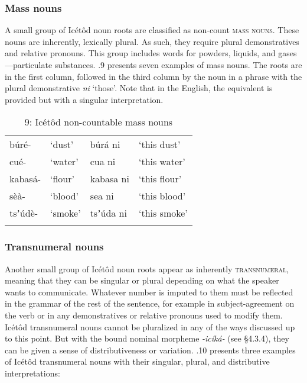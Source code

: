 \subsubsection{Mass nouns}

A small group of Icétôd noun roots are classified as non-count \textsc{mass} \textsc{nouns}. These nouns are inherently, lexically plural. As such, they require plural demonstratives and relative pronouns. This group includes words for powders, liquids, and gases—particulate substances. .9 presents seven examples of mass nouns. The roots are in the first column, followed in the third column by the noun in a phrase with the plural demonstrative \textit{ni} ‘those’. Note that in the English, the equivalent is provided but with a singular interpretation.


\begin{table}
\caption{9: Icétôd non-countable mass nouns}
\label{tab:4}


\begin{tabularx}{\textwidth}{XXXX}
\lsptoprule

búré- & ‘dust’ & búrá ni & ‘this dust’\\
cué- & ‘water’ & cua ni & ‘this water’\\
kabasá- & ‘flour’ & kabasa ni & ‘this flour’\\
sèà- & ‘blood’ & sea ni & ‘this blood’\\
tsʼúdè- & ‘smoke’ & tsʼúda ni & ‘this smoke’\\
\lspbottomrule
\end{tabularx}
\end{table}

\subsubsection{Transnumeral nouns}

Another small group of Icétôd noun roots appear as inherently \textsc{transnumeral}, meaning that they can be singular or plural depending on what the speaker wants to communicate. Whatever number is imputed to them must be reflected in the grammar of the rest of the sentence, for example in subject-agreement on the verb or in any demonstratives or relative pronouns used to modify them. Icétôd transnumeral nouns cannot be pluralized in any of the ways discussed up to this point. But with the bound nominal morpheme \textit{{}-icíká-} (see §4.3.4), they can be given a sense of distributiveness or variation. .10 presents three examples of Icétôd transnumeral nouns with their singular, plural, and distributive interpretations:


